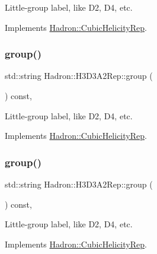 Little-\/group label, like D2, D4, etc. 

Implements \mbox{\hyperlink{structHadron_1_1CubicHelicityRep_a101a7d76cd8ccdad0f272db44b766113}{Hadron\+::\+Cubic\+Helicity\+Rep}}.

\mbox{\label{structHadron_1_1H3D3A2Rep_ab7175e896239ed28493bfe574e0b6b9e}} 
\subsubsection{\texorpdfstring{group()}{group()}\hspace{0.1cm}{\footnotesize\ttfamily [3/5]}}
{\footnotesize\ttfamily std\+::string Hadron\+::\+H3\+D3\+A2\+Rep\+::group (\begin{DoxyParamCaption}{ }\end{DoxyParamCaption}) const\hspace{0.3cm}{\ttfamily [inline]}, {\ttfamily [virtual]}}

Little-\/group label, like D2, D4, etc. 

Implements \mbox{\hyperlink{structHadron_1_1CubicHelicityRep_a101a7d76cd8ccdad0f272db44b766113}{Hadron\+::\+Cubic\+Helicity\+Rep}}.

\mbox{\label{structHadron_1_1H3D3A2Rep_ab7175e896239ed28493bfe574e0b6b9e}} 
\subsubsection{\texorpdfstring{group()}{group()}\hspace{0.1cm}{\footnotesize\ttfamily [4/5]}}
{\footnotesize\ttfamily std\+::string Hadron\+::\+H3\+D3\+A2\+Rep\+::group (\begin{DoxyParamCaption}{ }\end{DoxyParamCaption}) const\hspace{0.3cm}{\ttfamily [inline]}, {\ttfamily [virtual]}}

Little-\/group label, like D2, D4, etc. 

Implements \mbox{\hyperlink{structHadron_1_1CubicHelicityRep_a101a7d76cd8ccdad0f272db44b766113}{Hadron\+::\+Cubic\+Helicity\+Rep}}.

\mbox{\label{structHadron_1_1H3D3A2Rep_ab7175e896239ed28493bfe574e0b6b9e}} 
